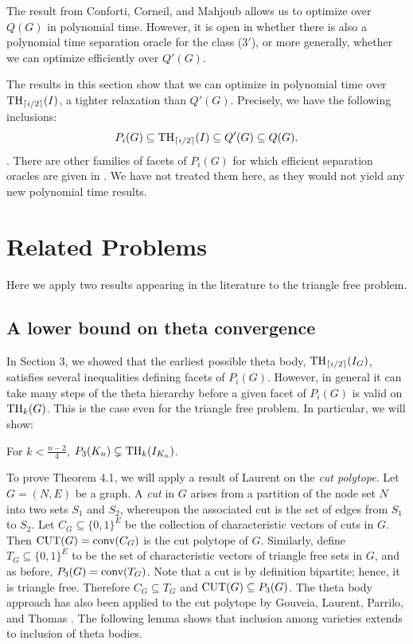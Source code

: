 The result from Conforti, Corneil, and Mahjoub allows us to optimize over $Q(G)$ in polynomial time. However, it is open in \cite{conforti} whether there is also a polynomial time separation oracle for the class ($3'$), or more generally, whether we can optimize efficiently over $Q'(G)$. 

The results in this section show that we can optimize in polynomial time over $\textup{TH}_{\lceil i/2 \rceil}(I)$, a tighter relaxation than $Q'(G)$. Precisely, we have the following inclusions:
$$P_{i}(G) \subseteq  \textup{TH}_{\lceil i/2 \rceil}(I) \subseteq Q'(G) \subseteq Q(G).$$.
There are other families of facets of $P_i(G)$ for which efficient separation oracles are given in \cite{conforti}. We have not treated them here, as they would not yield any new polynomial time results.

\section{Related Problems}
Here we apply two results appearing in the literature to the triangle free problem.

\subsection{A lower bound on theta convergence}
In Section 3, we showed that the earliest possible theta body, $\textup{TH}_{\lceil i/2 \rceil}(I_G)$, satisfies several inequalities defining facets of $P_i(G)$. However, in general it can take many steps of the theta hierarchy before a given facet of $P_i(G)$ is valid on $\textup{TH}_k(G)$. This is the case even for the triangle free problem. In particular, we will show:
\begin{theorem}
For $k < \frac{n-2}{4}$, $P_3(K_n) \subsetneq \textup{TH}_{k}(I_{K_n})$.
\end{theorem}

To prove Theorem 4.1, we will apply a result of Laurent on the {\em cut polytope}. Let $G=(N,E)$ be a graph. A {\em cut} in $G$ arises from a partition of the node set $N$ into two sets $S_1$ and $S_2$, whereupon the associated cut is the set of edges from $S_1$ to $S_2$. Let $C_G \subseteq \{0,1\}^E$ be the collection of characteristic vectors of cuts in $G$. Then $\textup{CUT}(G) = \textup{conv}(C_G)$ is the cut polytope of $G$. Similarly, define $T_G \subseteq \{0,1\}^E$ to be the set of characteristic vectors of triangle free sets in $G$, and as before, $P_3(G) = \textup{conv}(T_G)$. Note that a cut is by definition bipartite; hence, it is triangle free. Therefore $C_G \subseteq T_G$ and $\textup{CUT}(G) \subseteq P_3(G)$. The theta body approach has also been applied to the cut polytope by Gouveia, Laurent, Parrilo, and Thomas \cite{GLPT}. The following lemma shows that inclusion among varieties extends to inclusion of theta bodies.

